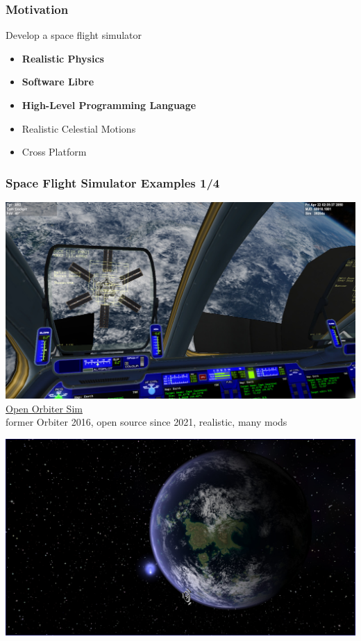 \documentclass[aspectratio=169,11pt,xcolor=dvipsnames]{beamer}
\begin{document}
\begin{frame}
  \frametitle{Motivation}
  Develop a space flight simulator
  \begin{itemize}
    \item \textbf{Realistic Physics}
    \item \textbf{Software Libre}
    \item \textbf{High-Level Programming Language}
    \item Realistic Celestial Motions
    \item Cross Platform
  \end{itemize}
\end{frame}

\begin{frame}
  \frametitle{Space Flight Simulator Examples 1/4}
  \begin{minipage}[t]{0.49\textwidth}
    \begin{center}
      \includegraphics[width=\textwidth]{orbiter}\\
      \href{https://openorbiter.space/}{Open Orbiter Sim}\\
      former Orbiter 2016, open source since 2021, realistic, many mods
    \end{center}
  \end{minipage}
  \begin{minipage}[t]{0.49\textwidth}
    \begin{center}
      \includegraphics[width=\textwidth]{nerds}\\

\end{center}
\end{minipage}
\end{frame}
\end{document}
